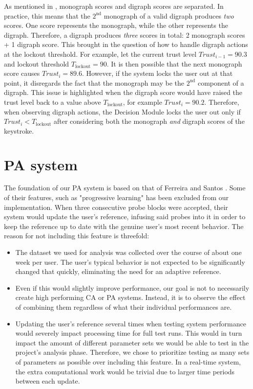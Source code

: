 As mentioned in , monograph scores and digraph scores are separated.
In practice, this means that the $2^{\text{nd}}$ monograph of a valid digraph produces \textit{two} scores.
One score represents the monograph, while the other represents the digraph.
Therefore, a digraph produces \textit{three} scores in total: 2 monograph scores + 1 digraph score. 
This brought in the question of how to handle digraph actions at the lockout threshold.
For example, let the current trust level $Trust_{i-1} = 90.3$ and lockout threshold $T_{\text{lockout}} = 90$.
It is then possible that the next monograph score causes $Trust_i = 89.6$.
However, if the system locks the user out at that point, it disregards the fact that the monograph may be the $2^{\text{nd}}$ component of a digraph.
This issue is highlighted when the digraph score would have raised the trust level back to a value above $T_{\text{lockout}}$, for example $Trust_i = 90.2$.
Therefore, when observing digraph actions, the Decision Module locks the user out only if $Trust_i < T_{\text{lockout}}$ after considering both the monograph \textit{and} digraph scores of the keystroke.

\section{PA system}
The foundation of our PA system is based on that of Ferreira and Santos \cite{superResults}.
Some of their features, such as "progressive learning" has been excluded from our implementation.
When three consecutive probe blocks were accepted, their system would update the user's reference, infusing said probes into it in order to keep the reference up to date with the genuine user's most recent behavior.
The reason for not including this feature is threefold:
\begin{itemize}
    \item The dataset we used for analysis was collected over the course of about one week per user. The user's typical behavior is not expected to be significantly changed that quickly, eliminating the need for an adaptive reference.
    \item Even if this would slightly improve performance, our goal is not to necessarily create high performing CA or PA systems. 
    Instead, it is to observe the effect of combining them regardless of what their individual performances are.
    \item Updating the user's reference several times when testing system performance would severely impact processing time for full test runs. 
    This would in turn impact the amount of different parameter sets we would be able to test in the project's analysis phase.
    Therefore, we chose to prioritize testing as many sets of parameters as possible over including this feature.
    In a real-time system, the extra computational work would be trivial due to larger time periods between each update.
\end{itemize}


